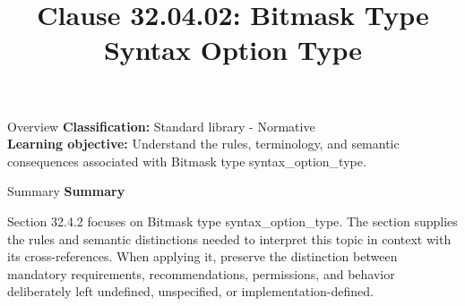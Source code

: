 \documentclass[10pt,letterpaper]{article}
\title{Clause 32.04.02: Bitmask Type Syntax Option Type}
\author{}
\date{}
\begin{document}
\maketitle
\begin{CornellOverviewBox}{Overview}
\textbf{Classification:} Standard library - Normative\\[2pt]
\textbf{Learning objective:} Understand the rules, terminology, and semantic consequences associated with Bitmask type syntax\_option\_type.
\end{CornellOverviewBox}\begin{CornellSummaryBox}{Summary}
{\sffamily\bfseries\color{Accent} Summary}\par\vspace{3pt}Section 32.4.2 focuses on Bitmask type syntax\_option\_type. The section supplies the rules and semantic distinctions needed to interpret this topic in context with its cross-references. When applying it, preserve the distinction between mandatory requirements, recommendations, permissions, and behavior deliberately left undefined, unspecified, or implementation-defined.
\end{CornellSummaryBox}
\end{document}
